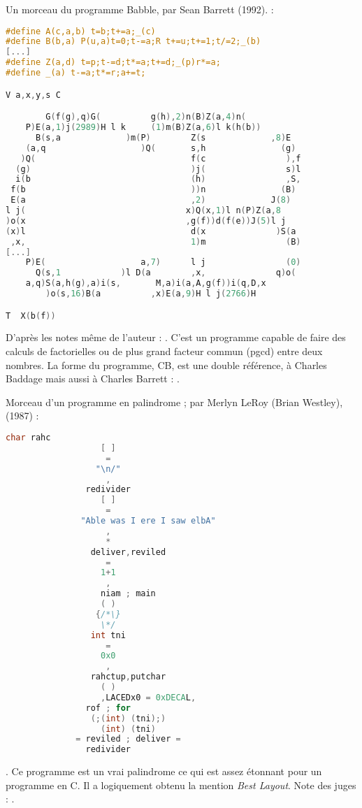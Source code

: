 \documentclass[12pt]{article} %
\begin{document}
\newpage
Un morceau du programme Babble, par Sean Barrett (1992). :
\begin{lstlisting}[language=C, caption={Babble}, label={code:babble}]
#define A(c,a,b) t=b;t+=a;_(c)
#define	B(b,a) P(u,a)t=0;t-=a;R t+=u;t+=1;t/=2;_(b)
[...]
#define Z(a,d) t=p;t-=d;t*=a;t+=d;_(p)r*=a;
#define _(a) t-=a;t*=r;a+=t;

V a,x,y,s C

	    G(f(g),q)G(          g(h),2)n(B)Z(a,4)n(
	P)E(a,1)j(2989)H l k     (1)m(B)Z(a,6)l k(h(b))
      B(s,a             )m(P)        Z(s             ,8)E
    (a,q                   )Q(       s,h               (g)
   )Q(                               f(c                ),f
  (g)                                )j(                s)l
  i(b                                (h)                ,S,
 f(b                                 ))n               (B)
 E(a                                 ,2)             J(8)
l j(                                x)Q(x,1)l n(P)Z(a,8
)o(x                                ,g(f))d(f(e))J(5)l j
(x)l                                 d(x              )S(a
 ,x,                                 1)m                (B)
[...]
    P)E(                   a,7)      l j                (0)
      Q(s,1            )l D(a        ,x,              q)o(
	a,q)S(a,h(g),a)i(s,       M,a)i(a,A,g(f))i(q,D,x
	    )o(s,16)B(a          ,x)E(a,9)H l j(2766)H

T  X(b(f))
\end{lstlisting}

D'après les notes même de l'auteur :  \cite{SBarrett-Babble}. C'est un programme capable de faire des calculs de factorielles ou de plus grand facteur commun (\acrshort{pgcd}) entre deux nombres. La forme du programme, CB, est une double référence, à Charles Baddage mais aussi à Charles Barrett :  \cite{SBarrett-Babble}.

\newpage
Morceau d'un programme en palindrome ; par Merlyn LeRoy (Brian Westley), (1987) :
\begin{lstlisting}[language=C, caption={Palindrome}, label={code:palindrome}]
				char rahc
				   [ ]
				    =
				  "\n/"
				    ,
				redivider
				   [ ]
				    =
		       "Able was I ere I saw elbA"
				    ,
				    *
			     deliver,reviled
				    =
				   1+1
				    ,
			       niam ; main
				   ( )
				  {/*\}
				   \*/
				 int tni
				    =
				   0x0
				    ,
			     rahctup,putchar
				   ( )
		           ,LACEDx0 = 0xDECAL,
				rof ; for
			     (;(int) (tni);)
			       (int) (tni)
			  = reviled ; deliver =
				redivider
\end{lstlisting}
 \cite{MEnriqueBermudez-ObfuscatedCCode}. Ce programme est un vrai \gls{palindrome} ce qui est assez étonnant pour un programme en C. Il a logiquement obtenu la mention \textit{Best Layout}. Note des juges : .
\end{document}
